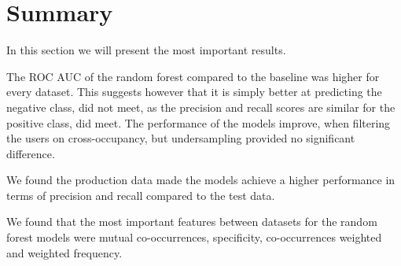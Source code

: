 \section{Summary}
In this section we will present the most important results.

The ROC AUC of the random forest compared to the baseline was higher for every dataset. This suggests however that it is simply better at predicting the negative class, did not meet, as the precision and recall scores are similar for the positive class, did meet. 
The performance of the models improve, when filtering the users on cross-occupancy, but undersampling provided no significant difference.

We found the production data made the models achieve a higher performance in terms of precision and recall compared to the test data.

We found that the most important features between datasets for the random forest models were mutual co-occurrences, specificity, co-occurrences weighted and weighted frequency.